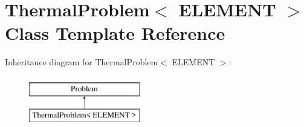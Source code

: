 \hypertarget{classThermalProblem}{}\section{Thermal\+Problem$<$ E\+L\+E\+M\+E\+NT $>$ Class Template Reference}
\label{classThermalProblem}
Inheritance diagram for Thermal\+Problem$<$ E\+L\+E\+M\+E\+NT $>$\+:\begin{figure}[H]
\begin{center}
\leavevmode
\includegraphics[height=2.000000cm]{classThermalProblem}
\end{center}
\end{figure}
